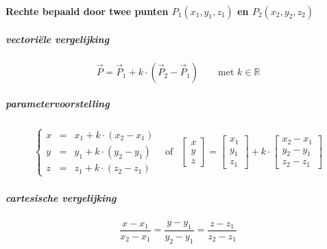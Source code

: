 \paragraph{Rechte bepaald door twee punten $P_1(x_1,y_1,z_1)$ en $P_2(x_2,y_2,z_2)$}
\label{sec:RechtePuntPunt}
  \subparagraph{vectoriële vergelijking}
  \label{sec:RechtePuntPuntVECTOR}
    \[
      \vec P = \vec P_1 + k \cdot \left( \vec P_2 - \vec P_1 \right)  \qquad \textrm{met $k \in \mathbb{R}$}
    \]
  \subparagraph{parametervoorstelling}
  \label{sec:RechtePuntPuntPARAM}
    \[
      \begin{array}{lcr}
        \left\{
          \begin{array}{rcl}
            x &=& x_1 + k \cdot \left(x_2-x_1\right)\\
            y &=& y_1 + k \cdot \left(y_2-y_1\right)\\
            z &=& z_1 + k \cdot \left(z_2-z_1\right)
          \end{array}%
        \right. &%
      \textrm{of} &%
        \left[
          \begin{array}{c}
            x\\ y\\ z
          \end{array}
        \right]
       =
        \left[
          \begin{array}{c}
            x_1\\ y_1\\ z_1
          \end{array}
        \right]
      + k \cdot
        \left[
          \begin{array}{c}
            x_2-x_1\\ y_2-y_1\\ z_2-z_1
          \end{array}
        \right]
     \end{array}
   \]
  \subparagraph{cartesische vergelijking}
  \label{sec:RechtePuntPuntCART}
    \[
      \frac{x-x_1}{x_2-x_1} = \frac{y-y_1}{y_2-y_1} = \frac{z-z_1}{z_2-z_1} 
    \]
 
